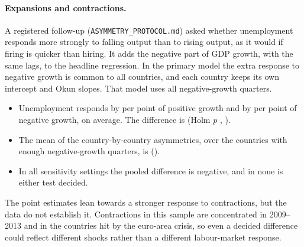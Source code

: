 \paragraph{Expansions and contractions.} A registered follow-up
(\texttt{ASYMMETRY\_PROTOCOL.md}) asked whether unemployment responds more strongly to
falling output than to rising output, as it would if firing is quicker than hiring. It
adds the negative part of GDP growth, with the same lags, to the headline regression. In
the primary model the extra response to negative growth is common to all countries, and
each country keeps its own intercept and Okun slopes. That model uses all
 negative-growth quarters.
\begin{itemize}
  \item Unemployment responds by  per point of positive growth and by
     per point of negative growth, on average. The difference is
      (Holm $p$ , ).
  \item The mean of the country-by-country asymmetries, over the  countries
    with enough negative-growth quarters, is  
    ().
  \item In all  sensitivity settings the pooled difference is negative,
    and in none is either test decided.
\end{itemize}
The point estimates lean towards a stronger response to contractions, but the data do
not establish it. Contractions in this sample are concentrated in 2009--2013 and in the
countries hit by the euro-area crisis, so even a decided difference could reflect
different shocks rather than a different labour-market response.

